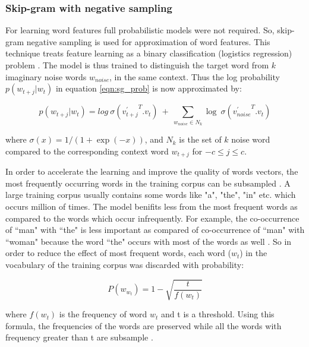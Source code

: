 \subsubsection{Skip-gram with negative sampling}

For learning word features full probabilistic models were not required. So, skip-gram negative sampling is used for approximation of word features. This technique treats feature learning as a binary classification (logistics regression) problem \cite{w2v:mikolov_2013_distributed, w2v:tensor_flow}. The model is thus trained to distinguish the target word from $k$ imaginary noise words $w_{noise}$, in the same context. Thus the log probability $p(w_{t+j}|w_t)$ in equation \ref{eqn:sg_prob} is now approximated by:

\begin{equation}
p(w_{t+j}|w_t)=log\ \sigma({{v^{'}_{t+j}}^{T}}.{v_t})\ +\  \sum_{w_{noise}{\in}N_{k}} \log\ \sigma({{v^{'}_{noise}}^T}.v_{t})
\end{equation}

\noindent where $\sigma(x)=1/(1+\exp(-x))$, and $N_k$ is the set of $k$ noise word compared to the corresponding context word $w_{t+j}$ for $-c \leq j \leq c$. 

In order to accelerate the learning and improve the quality of words vectors, the most frequently occurring words in the training corpus can be subsampled \cite{w2v:mikolov_2013_distributed}. A large training corpus usually contains some words like "a", "the", "in" etc. which occurs million of times. The model benifits less from the most frequent words as compared to the words which occur infrequently. For example, the co-occurrence of ``man" with ``the" is less important as compared of co-occurrence of ``man" with ``woman" because the word ``the" occurs with most of the words as well \cite{w2v:mikolov_2013_distributed}. So in order to reduce the effect of most frequent words, each word ($w_{t}$) in the vocabulary of the training corpus was discarded with probability:

\begin{equation} \label{eqn:subsampling}
P(w_{w_t})= 1- \sqrt{ \frac {t}{f(w_{t})}}
\end{equation}

\noindent where $f(w_{t})$ is the frequency of word $w_{t}$ and t is a threshold. Using this formula, the  frequencies of the words are preserved while all the words with frequency greater than t are subsample \cite{w2v:mikolov_2013_distributed}.


